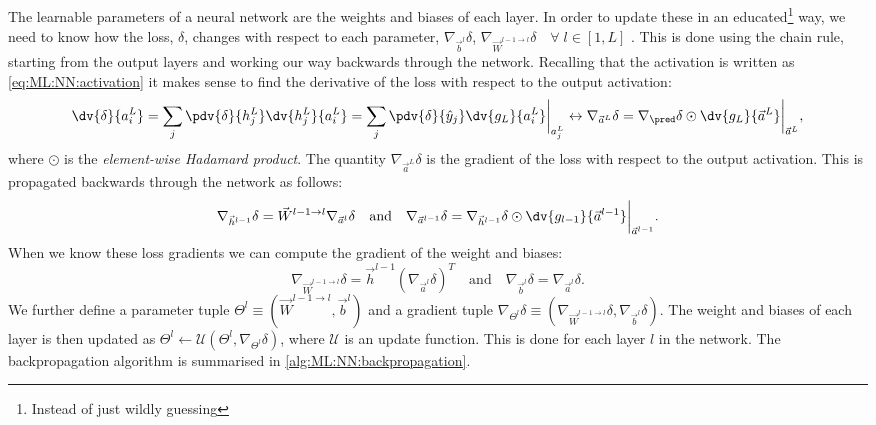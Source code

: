     \subsection{}
        The learnable parameters of a neural network are the weights and biases of each layer. In order to update these in an educated\footnote{Instead of just wildly guessing} way, we need to know how the loss, $\delta$, changes with respect to each parameter, $\nabla_{\vec{b}^l}\delta$, $\nabla_{\vec{W}^{l-1\to l}}\delta \quad \forall \; l \in [1,L]$ . This is done using the chain rule, starting from the output layers and working our way backwards through the network. Recalling that the activation is written as \cref{eq:ML:NN:activation} it makes sense to find the derivative of the loss with respect to the output activation:
        \begin{equation}
            \dv{\delta}{a^L_i} = \sum_j\pdv{\delta}{h^L_j}\dv{h^L_j}{a^L_i} = \sum_j\pdv{\delta}{\hat{y}_j}\dv{g_L}{a^L_i}\bigg|_{a^L_j} \leftrightarrow \nabla_{\vec{a}^L}\delta = \nabla_{\pred}\delta \odot \dv{g_L}{\vec{a}^L}\bigg|_{\vec{a}^L},
        \end{equation}
        where $\odot$ is the \textit{element-wise Hadamard product}. The quantity $\nabla_{\vec{a}^L}\delta$ is the gradient of the loss with respect to the output activation. This is propagated backwards through the network as follows:
        \begin{equation}
            \nabla_{\vec{h}^{l-1}}\delta = \vec{W}^{l-1\to l}\nabla_{\vec{a}^l}\delta \quad \mathrm{and} \quad \nabla_{\vec{a}^{l-1}}\delta = \nabla_{\vec{h}^{l-1}}\delta \odot \dv{g_{l-1}}{\vec{a}^{l-1}}\bigg|_{\vec{a}^{l-1}}.
        \end{equation}
        When we know these loss gradients we can compute the gradient of the weight and biases:
        \begin{equation}
            \nabla_{\vec{W}^{l-1\to l}}\delta = \vec{h}^{l-1}(\nabla_{\vec{a}^l}\delta)^T \quad \mathrm{and} \quad \nabla_{\vec{b}^l}\delta = \nabla_{\vec{a}^l}\delta.
        \end{equation}
        We further define a parameter tuple $\Theta^l \equiv (\vec{W}^{l-1\to l}, \vec{b}^l)$ and a gradient tuple $\nabla_{\Theta^l}\delta \equiv (\nabla_{\vec{W}^{l-1\to l}}\delta, \nabla_{\vec{b}^l}\delta)$. The weight and biases of each layer is then updated as $\Theta^l \leftarrow \mathcal{U}(\Theta^l, \nabla_{\Theta^l}\delta)$, where $\mathcal{U}$ is an update function. This is done for each layer $l$ in the network. The backpropagation algorithm is summarised in \cref{alg:ML:NN:backpropagation}.
